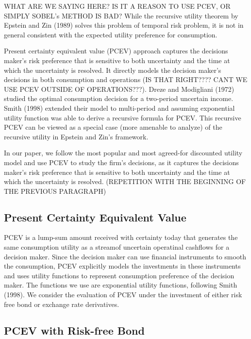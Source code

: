 \documentclass[mnsc,nonblindrev,copyedit]{informs2_wz} %
\begin{document}
WHAT ARE WE SAYING HERE?  IS IT A REASON TO USE PCEV, OR SIMPLY SOBEL's METHOD IS BAD?  
While the recursive utility theorem by Epstein and Zin (1989) solves this problem of temporal risk problem, it is not in general consistent with the expected utility preference for consumption. 


Present certainty equivalent value (PCEV) approach captures the decisions maker's risk preference that is sensitive to both uncertainty and the time at which the uncertainty is resolved.
It directly models the decision maker's decisions in both consumption and operations (IS THAT RIGHT???? CANT WE USE PCEV OUTSIDE OF OPERATIONS???). Dreze and Modigliani (1972) studied the optimal consumption decision for a two-period uncertain income. Smith (1998) extended their model to multi-period and assuming exponential utility function was able to derive a recursive formula for PCEV. This recursive PCEV can be viewed as a special case (more amenable to analyze) of the recursive utility in Epstein and Zin's framework. 


In our paper, we follow the most popular and most agreed-for discounted utility model and use PCEV to study the firm's decisions, as it captures the decisions maker's risk preference that is sensitive to both uncertainty and the time at which the uncertainty is resolved. (REPETITION WITH THE BEGINNING OF THE PREVIOUS PARAGRAPH)




\subsection{ Present Certainty Equivalent Value \label{sect:pcev}}

PCEV is a lump-sum amount received with certainty today that generates the same consumption utility as a streamof uncertain operatinal cashflows for a decision maker. Since the decision maker can use financial instruments to smooth the consumption, PCEV explicitly models the investments in these instruments and uses utility functions to represent consumption preference of the decision maker. The functions we use are exponential utility functions, following Smith (1998). We consider the evaluation of PCEV under the investment of either risk free bond or exchange rate derivatives.


\subsection{PCEV with Risk-free Bond}
\end{document}
